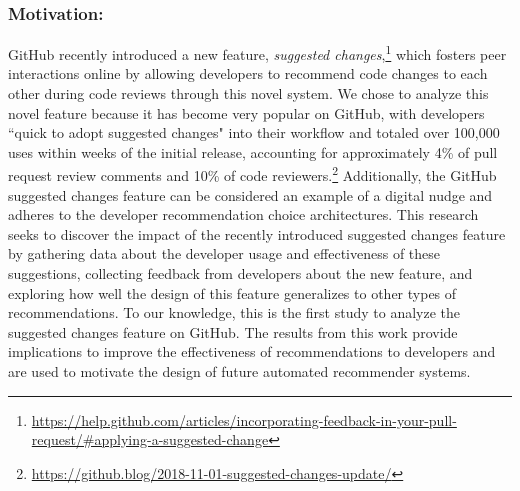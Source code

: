 \subsubsection{Motivation:} GitHub recently introduced a new feature, \textit{suggested changes},\footnote{\url{https://help.github.com/articles/incorporating-feedback-in-your-pull-request/\#applying-a-suggested-change}} which fosters peer interactions online by allowing developers to recommend code changes to each other during code reviews through this novel system. We chose to analyze this novel feature because it has become very popular on GitHub, with developers ``quick to adopt suggested changes" into their workflow and totaled over 100,000 uses within weeks of the initial release, accounting for approximately 4\% of pull request review comments and 10\% of code  reviewers.\footnote{\label{SuggestBlog}\url{https://github.blog/2018-11-01-suggested-changes-update/}} Additionally, the GitHub suggested changes feature can be considered an example of a digital nudge and adheres to the developer recommendation choice architectures. This research seeks to discover the impact of the recently introduced suggested changes feature by gathering data about the developer usage and effectiveness of these suggestions, collecting feedback from developers about the new feature, and exploring how well the design of this feature generalizes to other types of recommendations. To our knowledge, this is the first study to analyze the suggested changes feature on GitHub. The results from this work provide implications to improve the effectiveness of recommendations to developers and are used to motivate the design of future automated recommender systems.

